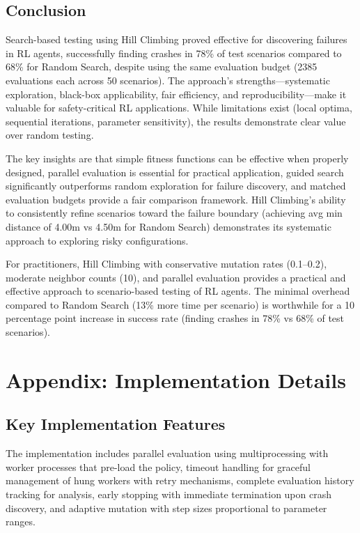 \documentclass[11pt,a4paper]{article}
\begin{document}
\subsection{Conclusion}

Search-based testing using Hill Climbing proved effective for discovering failures in RL agents, successfully finding crashes in 78\% of test scenarios compared to 68\% for Random Search, despite using the same evaluation budget (2385 evaluations each across 50 scenarios). The approach's strengths---systematic exploration, black-box applicability, fair efficiency, and reproducibility---make it valuable for safety-critical RL applications. While limitations exist (local optima, sequential iterations, parameter sensitivity), the results demonstrate clear value over random testing.

The key insights are that simple fitness functions can be effective when properly designed, parallel evaluation is essential for practical application, guided search significantly outperforms random exploration for failure discovery, and matched evaluation budgets provide a fair comparison framework. Hill Climbing's ability to consistently refine scenarios toward the failure boundary (achieving avg min distance of 4.00m vs 4.50m for Random Search) demonstrates its systematic approach to exploring risky configurations.

For practitioners, Hill Climbing with conservative mutation rates (0.1--0.2), moderate neighbor counts (10), and parallel evaluation provides a practical and effective approach to scenario-based testing of RL agents. The minimal overhead compared to Random Search (13\% more time per scenario) is worthwhile for a 10 percentage point increase in success rate (finding crashes in 78\% vs 68\% of test scenarios).

\section*{Appendix: Implementation Details}

\subsection*{Key Implementation Features}

The implementation includes parallel evaluation using multiprocessing with worker processes that pre-load the policy, timeout handling for graceful management of hung workers with retry mechanisms, complete evaluation history tracking for analysis, early stopping with immediate termination upon crash discovery, and adaptive mutation with step sizes proportional to parameter ranges.
\end{document}
